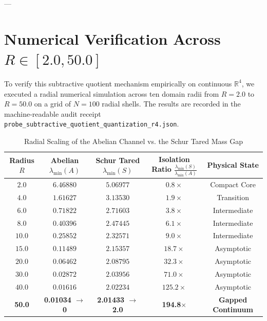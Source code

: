 \documentclass[11pt,a4paper]{article}
\begin{document}
---

\section{Numerical Verification Across \texorpdfstring{$R \in [2.0, 50.0]$}{R in [2.0, 50.0]}}

To verify this subtractive quotient mechanism empirically on continuous $\mathbb{R}^4$, we executed a radial numerical simulation across ten domain radii from $R = 2.0$ to $R = 50.0$ on a grid of $N = 100$ radial shells. The results are recorded in the machine-readable audit receipt \texttt{probe\_subtractive\_quotient\_quantization\_r4.json}.

\begin{table}[htbp]
\centering
\caption{Radial Scaling of the Abelian Channel vs. the Schur Tared Mass Gap}
\label{tab:subtractive_sweep}
\vspace{0.2cm}
\begin{tabular}{ccccc}
\toprule
\textbf{Radius $R$} & \textbf{Abelian $\lambda_{\min}(A)$} & \textbf{Schur Tared $\lambda_{\min}(S)$} & \textbf{Isolation Ratio $\frac{\lambda_{\min}(S)}{\lambda_{\min}(A)}$} & \textbf{Physical State} \\
\midrule
$2.0$  & $6.46880$ & $5.06977$ & $0.8\times$   & Compact Core \\
$4.0$  & $1.61627$ & $3.13530$ & $1.9\times$   & Transition \\
$6.0$  & $0.71822$ & $2.71603$ & $3.8\times$   & Intermediate \\
$8.0$  & $0.40396$ & $2.47445$ & $6.1\times$   & Intermediate \\
$10.0$ & $0.25852$ & $2.32571$ & $9.0\times$   & Intermediate \\
$15.0$ & $0.11489$ & $2.15357$ & $18.7\times$  & Asymptotic \\
$20.0$ & $0.06462$ & $2.08795$ & $32.3\times$  & Asymptotic \\
$30.0$ & $0.02872$ & $2.03956$ & $71.0\times$  & Asymptotic \\
$40.0$ & $0.01616$ & $2.02234$ & $125.2\times$ & Asymptotic \\
\textbf{50.0} & \textbf{0.01034 $\to$ 0} & \textbf{2.01433 $\to$ 2.0} & \textbf{194.8$\times$} & \textbf{Gapped Continuum} \\
\bottomrule
\end{tabular}
\end{table}
\end{document}
